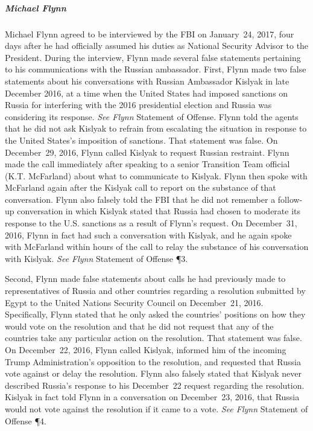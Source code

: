 \subparagraph{Michael Flynn}
Michael Flynn agreed to be interviewed by the FBI on January~24, 2017, four days after he had officially assumed his duties as National Security Advisor to the President.
During the interview, Flynn made several false statements pertaining to his communications with the Russian ambassador.
First, Flynn made two false statements about his conversations with Russian Ambassador Kislyak in late December 2016, at a time when the United States had imposed sanctions on Russia for interfering with the 2016 presidential election and Russia was considering its response.
\textit{See Flynn} Statement of Offense.
Flynn told the agents that he did not ask Kislyak to refrain from escalating the situation in response to the United States's imposition of sanctions.
That statement was false.
On December~29, 2016, Flynn called Kislyak to request Russian restraint.
Flynn made the call immediately after speaking to a senior Transition Team official (K.T. McFarland) about what to communicate to Kislyak.
Flynn then spoke with McFarland again after the Kislyak call to report on the substance of that conversation.
Flynn also falsely told the FBI that he did not remember a follow-up conversation in which Kislyak stated that Russia had chosen to moderate its response to the U.S. sanctions as a result of Flynn's request.
On December~31, 2016, Flynn in fact had such a conversation with Kislyak, and he again spoke with McFarland within hours of the call to relay the substance of his conversation with Kislyak.
\textit{See Flynn} Statement of Offense \P 3.

Second, Flynn made false statements about calls he had previously made to representatives of Russia and other countries regarding a resolution submitted by Egypt to the United Nations Security Council on December~21, 2016.
Specifically, Flynn stated that he only asked the countries' positions on how they would vote on the resolution and that he did not request that any of the countries take any particular action on the resolution.
That statement was false.
On December~22, 2016, Flynn called Kislyak, informed him of the incoming Trump Administration's opposition to the resolution, and requested that Russia vote against or delay the resolution.
Flynn also falsely stated that Kislyak never described Russia's response to his December~22 request regarding the resolution.
Kislyak in fact told Flynn in a conversation on December~23, 2016, that Russia would not vote against the resolution if it came to a vote.
\textit{See Flynn} Statement of Offense \P 4.

